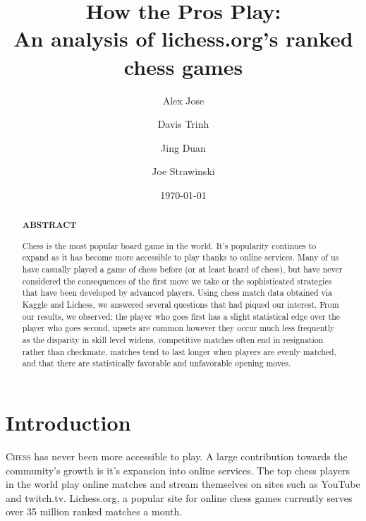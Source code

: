 \documentclass[reprint,
 amsmath,amssymb,nobibnotes,
 aps, floatfix]{revtex4-1}
\begin{document}
\title{How the Pros Play: \\ An analysis of lichess.org's ranked chess games }%

\author{Alex Jose}
\author{Davis Trinh}
\author{Jing Duan}
\author{Joe Strawinski}
%
\date{\today}%
\begin{abstract}
\begin{center}
    \textbf{ABSTRACT}
\end{center}
Chess is the most popular board game in the world. It’s popularity continues to expand as it has become more accessible to play thanks to online services. Many of us have casually played a game of chess before (or at least heard of chess), but have never considered the consequences of the first move we take or the sophisticated strategies that have been developed by advanced players. Using chess match data obtained via Kaggle and Lichess, we answered several questions that had piqued our interest. From our results, we observed: the player who goes first has a slight statistical edge over the player who goes second, upsets are common however they occur much less frequently as the disparity in skill level widens, competitive matches often end in resignation rather than checkmate, matches tend to last longer when players are evenly matched, and that there are statistically favorable and unfavorable opening moves.
\end{abstract}

\maketitle


\section{\label{sec:level1}Introduction}
\lettrine{C}{hess} has never been more accessible to play. A large contribution towards the community's growth is it's expansion into online services. The top chess players in the world play online matches and stream themselves on sites such as YouTube and twitch.tv.  Lichess.org, a popular site for online chess games currently serves over 35 million ranked matches a month.
\end{document}
